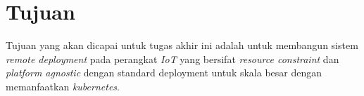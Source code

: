 \section{Tujuan}

Tujuan yang akan dicapai untuk tugas akhir ini adalah untuk membangun sistem \textit{remote deployment} pada perangkat \textit{IoT} yang bersifat \textit{resource constraint} dan \textit{platform agnostic} dengan standard deployment untuk skala besar dengan memanfaatkan \textit{kubernetes}.
